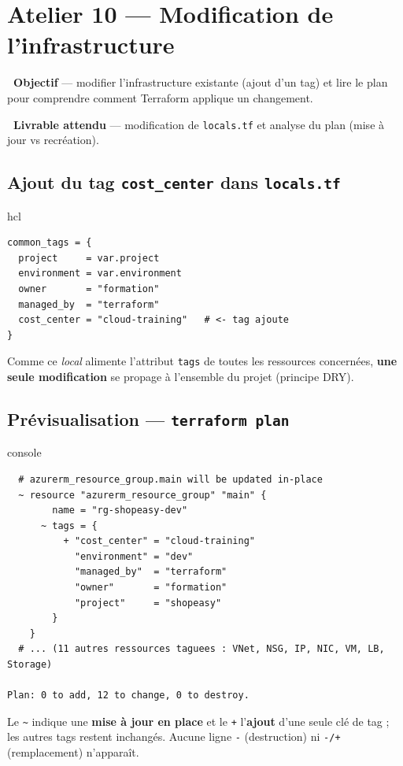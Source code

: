 \documentclass[11pt,a4paper]{article}
\newcommand{\emo}[1]{\raisebox{-0.14em}{\twemoji{#1}}}
\newcommand{\eTarget}{\emo{1f3af}}
\newcommand{\ePackage}{\emo{1f4e6}}
\newcommand{\code}[1]{\texttt{#1}}
\begin{document}
\section{Atelier 10 — Modification de l'infrastructure}

\begin{fiche}
\textbf{\eTarget~Objectif} — modifier l'infrastructure existante (ajout d'un tag) et lire le plan pour comprendre comment Terraform applique un changement.

\textbf{\ePackage~Livrable attendu} — modification de \code{locals.tf} et analyse du plan (mise à jour vs recréation).
\end{fiche}

\subsection{Ajout du tag \code{cost\_center} dans \code{locals.tf}}
\begin{codebox}{hcl}
\begin{Verbatim}
common_tags = {
  project     = var.project
  environment = var.environment
  owner       = "formation"
  managed_by  = "terraform"
  cost_center = "cloud-training"   # <- tag ajoute
}
\end{Verbatim}
\end{codebox}
Comme ce \textit{local} alimente l'attribut \code{tags} de toutes les ressources concernées, \textbf{une seule
modification} se propage à l'ensemble du projet (principe DRY).

\subsection{Prévisualisation — \code{terraform plan}}
\begin{codebox}{console}
\begin{Verbatim}
  # azurerm_resource_group.main will be updated in-place
  ~ resource "azurerm_resource_group" "main" {
        name = "rg-shopeasy-dev"
      ~ tags = {
          + "cost_center" = "cloud-training"
            "environment" = "dev"
            "managed_by"  = "terraform"
            "owner"       = "formation"
            "project"     = "shopeasy"
        }
    }
  # ... (11 autres ressources taguees : VNet, NSG, IP, NIC, VM, LB, Storage)

Plan: 0 to add, 12 to change, 0 to destroy.
\end{Verbatim}
\end{codebox}
Le \code{\textasciitilde} indique une \textbf{mise à jour en place} et le \code{+} l'\textbf{ajout} d'une seule
clé de tag ; les autres tags restent inchangés. Aucune ligne \code{-} (destruction) ni \code{-/+}
(remplacement) n'apparaît.
\end{document}
